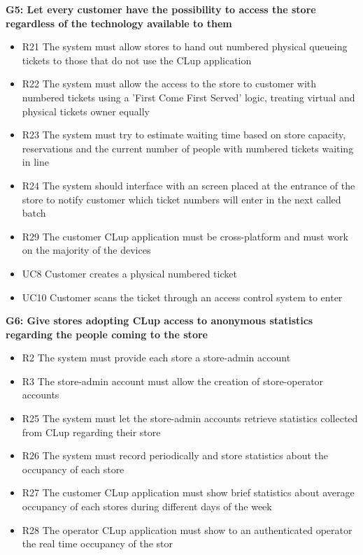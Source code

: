 \vfill
\pagebreak

\textbf{G5: Let every customer have the possibility to access the store regardless of the technology available to them}
\begin{itemize}[label=\textcolor{clup_blue2}{\textbullet}]
    \item R21 The system must allow stores to hand out numbered physical queueing tickets to those that do not use the CLup application
    \item R22 The system must allow the access to the store to customer with numbered tickets using a ’First Come First Served’ logic, treating virtual and physical tickets owner equally
    \item R23 The system must try to estimate waiting time based on store capacity, reservations and the current number of people with numbered tickets waiting in line
    \item R24 The system should interface with an screen placed at the entrance of the store to notify customer which ticket numbers will enter in the next called batch
    \item R29 The customer CLup application must be cross-platform and must work on the majority of the devices
\end{itemize}
\begin{itemize}[label=\textcolor{clup_red}{\textbullet}]
    \item UC8 Customer creates a physical numbered ticket
    \item UC10 Customer scans the ticket through an access control system to enter
\end{itemize}
\textbf{G6: Give stores adopting CLup access to anonymous statistics regarding the people coming to the store}
\begin{itemize}[label=\textcolor{clup_blue2}{\textbullet}]
    \item R2 The system must provide each store a store-admin account
    \item R3 The store-admin account must allow the creation of store-operator accounts
    \item R25 The system must let the store-admin accounts retrieve statistics collected from CLup regarding their store
    \item R26 The system must record periodically and store statistics about the occupancy of each store
    \item R27 The customer CLup application must show brief statistics about average occupancy of each stores during different days of the week
    \item R28 The operator CLup application must show to an authenticated operator the real time occupancy of the stor
\end{itemize}
